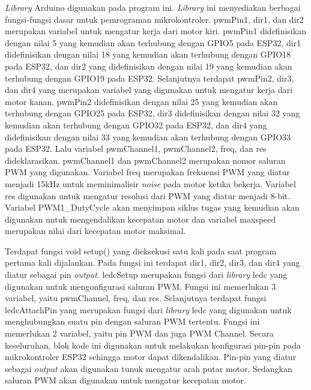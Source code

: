 \emph{Library} Arduino digunakan pada program ini. \emph{Library} ini menyediakan berbagai fungsi-fungsi dasar untuk pemrograman mikrokontroler. pwmPin1, dir1, dan dir2 merupakan variabel untuk mengatur kerja dari motor kiri. pwmPin1 didefinisikan dengan nilai 5 yang kemudian akan terhubung dengan GPIO5 pada ESP32, dir1 didefinisikan dengan nilai 18 yang kemudian akan terhubung dengan GPIO18 pada ESP32, dan dir2 yang didefinisikan dengan nilai 19 yang kemudian akan terhubung dengan GPIO19 pada ESP32. Selanjutnya terdapat pwmPin2, dir3, dan dir4 yang merupakan variabel yang digunakan untuk mengatur kerja dari motor kanan. pwmPin2 didefinisikan dengan nilai 25 yang kemudian akan terhubung dengan GPIO25 pada ESP32, dir3 didefinisikan dengan nilai 32 yang kemudian akan terhubung dengan GPIO32 pada ESP32, dan dir4 yang didefinisikan dengan nilai 33 yang kemudian akan terhubung dengan GPIO33 pada ESP32. Lalu variabel pwmChannel1, pwmChannel2, freq, dan res dideklarasikan. pwmChannel1 dan pwmChannel2 merupakan nomor saluran PWM yang digunakan. Variabel freq merupakan frekuensi PWM yang diatur menjadi 15kHz untuk meminimalisir \emph{noise} pada motor ketika bekerja. Variabel res digunakan untuk mengatur resolusi dari PWM yang diatur menjadi 8-bit. Variabel PWM1\_DutyCycle akan menyimpan siklus tugas yang kemudian akan digunakan untuk mengendalikan kecepatan motor dan variabel maxspeed merupakan nilai dari kecepatan motor maksimal.

Terdapat fungsi void setup() yang dieksekusi satu kali pada saat program pertama kali dijalankan. Pada fungsi ini terdapat dir1, dir2, dir3, dan dir4 yang diatur sebagai pin \emph{output}. ledcSetup merupakan fungsi dari \emph{library} ledc yang digunakan untuk mengonfigurasi saluran PWM. Fungsi ini memerlukan 3 variabel, yaitu pwmChannel, freq, dan res. Selanjutnya terdapat fungsi ledcAttachPin yang merupakan fungsi dari \emph{library} ledc yang digunakan untuk menghubungkan suatu pin dengan saluran PWM tertentu. Fungsi ini memerlukan 2 variabel, yaitu pin PWM dan juga PWM Channel. Secara keseluruhan, blok kode ini digunakan untuk melakukan konfigurasi pin-pin pada mikrokontroler ESP32 sehingga motor dapat dikendalikan. Pin-pin yang diatur sebagai \emph{output} akan digunakan tunuk mengatur arah putar motor. Sedangkan saluran PWM akan digunakan untuk mengatur kecepatan motor.

